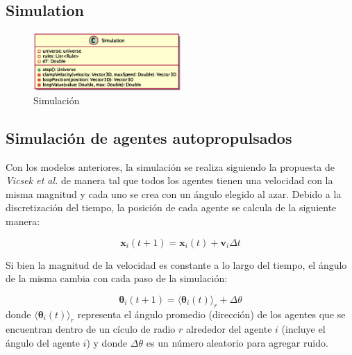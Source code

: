\documentclass[a4paper]{article}
\begin{document}
        \subsection{Simulation}

            \begin{figure}[H]
                \centering
                \includegraphics[width=0.5\textwidth]{../imgs/simulation}
                \caption{Simulación}
                \label{fig:simulation_implementation}
            \end{figure}

        \subsection{Simulación de agentes autopropulsados}

            Con los modelos anteriores, la simulación se realiza siguiendo la propuesta de \textit{Vicsek et al.} \cite{BoidsPaper} de manera tal que todos los agentes tienen una velocidad con la misma magnitud y cada uno se crea con un ángulo elegido al azar. Debido a la discretización del tiempo, la posición de cada agente se calcula de la siguiente manera:

            \begin{equation} %
            \mathbf{x}_i(t + 1) = \mathbf{x}_i(t) + \mathbf{v}_i\Delta t
            \end{equation}

            Si bien la magnitud de la velocidad es constante a lo largo del tiempo, el ángulo de la misma cambia con cada paso de la simulación:

            \begin{equation} %
            \mathbf{\theta}_i(t + 1) = \langle\mathbf{\theta}_i(t)\rangle_r + \Delta\theta
            \end{equation}
            donde $\langle\mathbf{\theta}_i(t)\rangle_r$ representa el ángulo promedio (dirección) de los agentes que se encuentran dentro de un cículo de radio $r$ alrededor del agente $i$ (incluye el ángulo del agente $i$) y donde $\Delta\theta$ es un número aleatorio para agregar ruido.
\end{document}
